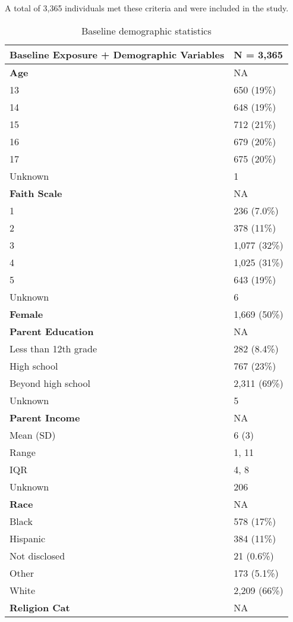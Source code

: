\documentclass[
  single column]{article}
\begin{document}
A total of 3,365 individuals met these criteria and were included in the
study.

\newpage{}

\begin{longtable}[]{@{}ll@{}}

\caption{\label{tbl-table-demography}Baseline demographic statistics}

\tabularnewline

\toprule\noalign{}
\textbf{Baseline Exposure + Demographic Variables} & \textbf{N =
3,365} \\
\midrule\noalign{}
\endhead
\bottomrule\noalign{}
\endlastfoot
\textbf{Age} & NA \\
13 & 650 (19\%) \\
14 & 648 (19\%) \\
15 & 712 (21\%) \\
16 & 679 (20\%) \\
17 & 675 (20\%) \\
Unknown & 1 \\
\textbf{Faith Scale} & NA \\
1 & 236 (7.0\%) \\
2 & 378 (11\%) \\
3 & 1,077 (32\%) \\
4 & 1,025 (31\%) \\
5 & 643 (19\%) \\
Unknown & 6 \\
\textbf{Female} & 1,669 (50\%) \\
\textbf{Parent Education} & NA \\
Less than 12th grade & 282 (8.4\%) \\
High school & 767 (23\%) \\
Beyond high school & 2,311 (69\%) \\
Unknown & 5 \\
\textbf{Parent Income} & NA \\
Mean (SD) & 6 (3) \\
Range & 1, 11 \\
IQR & 4, 8 \\
Unknown & 206 \\
\textbf{Race} & NA \\
Black & 578 (17\%) \\
Hispanic & 384 (11\%) \\
Not disclosed & 21 (0.6\%) \\
Other & 173 (5.1\%) \\
White & 2,209 (66\%) \\
\textbf{Religion Cat} & NA \\

\end{longtable}
\end{document}
